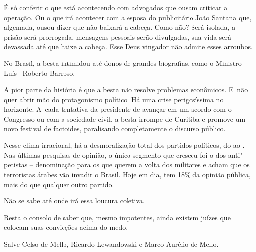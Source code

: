 É só conferir o que está acontecendo com advogados que ousam criticar a
operação. Ou o que irá acontecer com a esposa do publicitário João
Santana que, algemada, ousou dizer que não baixará a cabeça. Como não?
Será isolada, a prisão será prorrogada, mensagens pessoais serão
divulgadas, sua vida será devassada até que baixe a cabeça. Esse Deus
vingador não admite esses arroubos.

No Brasil, a besta intimidou até donos de grandes biografias, como o
Ministro Luís ~Roberto Barroso.

\asterisc{}

A pior parte da história é que a besta não resolve problemas econômicos.
E~não quer abrir mão do protagonismo político. Há uma crise
perigosíssima no horizonte. A~cada tentativa da presidente de avançar em
um acordo com o Congresso ou com a sociedade civil, a besta irrompe de
Curitiba e promove um novo festival de factoides, paralisando
completamente o discurso público.

\asterisc{}

Nesse clima irracional, há a desmoralização total dos partidos
políticos, do  ao . Nas últimas pesquisas de opinião, o único
segmento que cresceu foi o dos anti"-petistas -- denominação para os que
querem a volta dos militares e acham que os terroristas árabes vão
invadir o Brasil. Hoje em dia, tem 18\% da opinião pública, mais do que
qualquer outro partido.

\asterisc{}

Não se sabe até onde irá essa loucura coletiva.

Resta o consolo de saber que, mesmo impotentes, ainda existem juízes que
colocam suas convicções acima do medo.

Salve Celso de Mello, Ricardo Lewandowski e Marco Aurélio de Mello.
